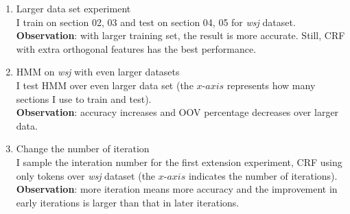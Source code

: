 \documentclass[winfonts,UTF8]{article}
\begin{document}
\begin{enumerate}
\item Larger data set experiment\\
I train on section 02, 03 and test on section 04, 05 for \emph{wsj} dataset.\\
\textbf{Observation}: with larger training set, the result is more accurate. Still, CRF with extra orthogonal features has the best performance.

\item HMM on \emph{wsj} with even larger datasets\\
I test HMM over even larger data set (the $x$-$axis$ represents how many sections I use to train and test).\\
\textbf{Observation}: accuracy increases and OOV percentage decreases over larger data.

\item Change the number of iteration\\
I sample the interation number for the first extension experiment, CRF using only tokens over \emph{wsj} dataset (the $x$-$axis$ indicates the number of iterations).\\
\textbf{Observation}: more iteration means more accuracy and the improvement in early iterations is larger than that in later iterations.


\end{enumerate}
\end{document}
